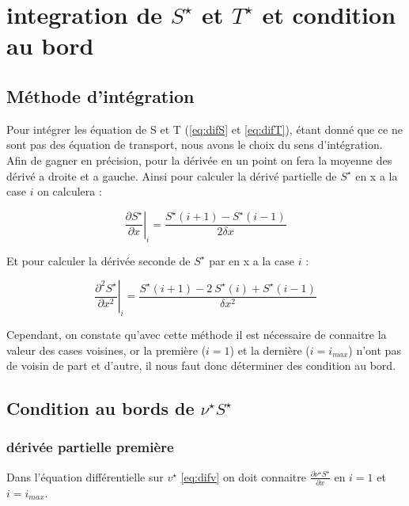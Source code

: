 \section{integration de $S^{\star}$ et $T^{\star}$ et condition au bord}

\subsection{Méthode d'intégration}

Pour intégrer les équation de S et T (\eqref{eq:difS} et \eqref{eq:difT}), étant donné que ce ne sont pas des équation de transport, nous avons le choix du sens d'intégration. Afin de gagner en précision, pour la dérivée en un point on fera la moyenne des dérivé a droite et a gauche. Ainsi pour calculer la dérivé partielle de $S^{\star}$ en x a la case $i$ on calculera :

\begin{equation}
\left. \frac{\partial S^{\star}}{\partial x} \right|_i = \frac{S^{\star}(i+1)-S^{\star}(i-1)}{2\delta x} \label{eq:dif_ordre1}
\end{equation}

Et pour calculer la dérivée seconde de $S^{\star}$ par en x a la case $i$ :

\begin{equation}
\left. \frac{\partial^2 S^{\star}}{\partial x^2}\right|_i=\frac{S^{\star}(i+1)-2\ S^{\star}(i) +S^{\star}(i-1)}{\delta x^2} \label{eq:dif_ordre2}
\end{equation}

Cependant, on constate qu'avec cette méthode il est nécessaire de connaitre la valeur des cases voisines, or la première ($i=1$) et la dernière ($i=i_{max}$) n'ont pas de voisin de part et d'autre, il nous faut donc déterminer des condition au bord.


\subsection{Condition au bords de $\nu^{\star}S^{\star}$}

\subsubsection{dérivée partielle première}

Dans l'équation différentielle sur $v^{\star}$ \eqref{eq:difv} on doit connaitre $\frac{\partial \nu^{\star} S^{\star}}{\partial x}$ en $i=1$ et $i=i_{max}$.

